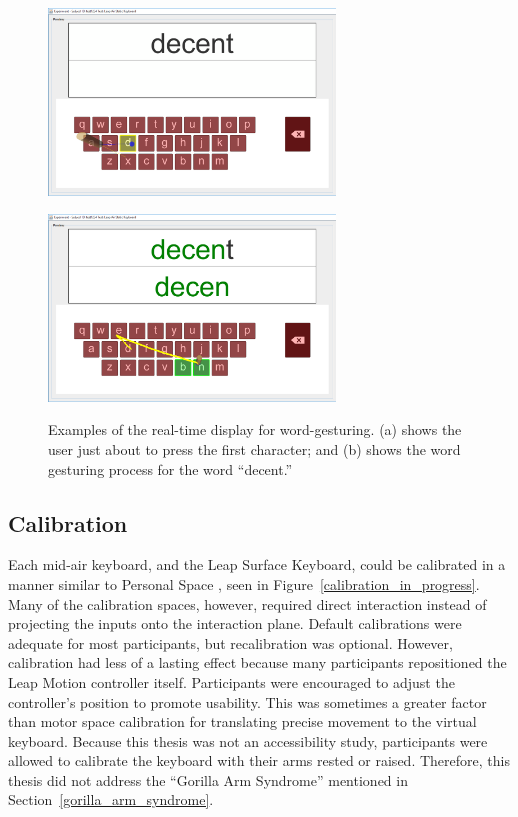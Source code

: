 \begin{figure}[!t]
	\centering
	\begin{minipage}[t]{2.9in}
		\includegraphics[width=3in]{Figures/fig_update1_keyboard}
		\label{update_a}
	\end{minipage}
	\begin{minipage}[t]{2.9in}
		\includegraphics[width=3in]{Figures/fig_update2_keyboard}
		\label{update_b}
	\end{minipage}
	\caption[Display: Real-time Updates]{Examples of the real-time display for word-gesturing. (a) shows the user just about to press the first character; and (b) shows the word gesturing process for the word ``decent.''}
	\label{display_area}
\end{figure}

\subsection{Calibration}
Each mid-air keyboard, and the Leap Surface Keyboard, could be calibrated in a manner similar to Personal Space \cite{ref_alvin_thesis}, seen in Figure~\ref{calibration_in_progress}. Many of the calibration spaces, however, required direct interaction instead of projecting the inputs onto the interaction plane. Default calibrations were adequate for most participants, but recalibration was optional. However, calibration had less of a lasting effect because many participants repositioned the Leap Motion controller itself. Participants were encouraged to adjust the controller's position to promote usability. This was sometimes a greater factor than motor space calibration for translating precise movement to the virtual keyboard. Because this thesis was not an accessibility study, participants were allowed to calibrate the keyboard with their arms rested or raised. Therefore, this thesis did not address the ``Gorilla Arm Syndrome'' mentioned in Section~\ref{gorilla_arm_syndrome}.

